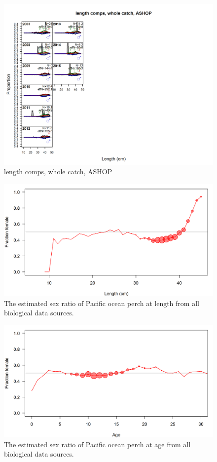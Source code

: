 \documentclass[12pt,]{article}
\begin{document}
\begin{figure}
\centering
\includegraphics{./r4ss/plots_mod1/comp_lenfit_flt2mkt0.png}
\caption{length comps, whole catch, ASHOP
\label{fig:mod1_10_comp_lenfit_flt2mkt0}}
\end{figure}

\FloatBarrier

\begin{figure}
\centering
\includegraphics{Figures/allSexRatios.png}
\caption{The estimated sex ratio of Pacific ocean perch at length from
all biological data sources. \label{fig:sexratio}}
\end{figure}

\begin{figure}
\centering
\includegraphics{Figures/allSexRatiosAge.png}
\caption{The estimated sex ratio of Pacific ocean perch at age from all
biological data sources. \label{fig:sexratio_Age}}
\end{figure}
\end{document}
